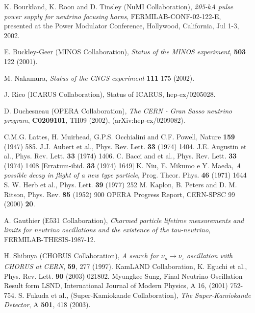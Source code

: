 \begin{thebibliography}{99}

 K. Bourkland, K. Roon and D. Tinsley (NuMI Collaboration),{\emph{ 205-kA pulse power supply for neutrino focusing horns}}, FERMILAB-CONF-02-122-E, presented at the Power Modulator Conference, Hollywood, California, Jul 1-3, 2002.

 E. Buckley-Geer (MINOS Collaboration), \emph{Status of the MINOS experiment}, \textbf{503}  122 (2001).

 M. Nakamura, {\emph{Status of the CNGS experiment}} \textbf{111}  175 (2002).

 J. Rico (ICARUS Collaboration), Status of ICARUS, hep-ex/0205028.

 D. Duchesneau (OPERA Collaboration), {\emph{The CERN - Gran Sasso neutrino program}}, \textbf{C0209101}, TH09 (2002),  (arXiv:hep-ex/0209082).

 C.M.G. Lattes, H. Muirhead, G.P.S. Occhialini and C.F. Powell, Nature {\bf{159}} (1947) 585. 
 J.J. Aubert et al., Phys. Rev. Lett. {\bf{33}} (1974) 1404.
 J.E. Augustin et al., Phys. Rev. Lett. {\bf{33}} (1974) 1406.
 C. Bacci and et al., Phys. Rev. Lett. {\bf{33}} (1974) 1408 [Erratum-ibid. {\bf{33}} (1974) 1649]
  K. Niu, E. Mikumo e Y. Maeda, {\em A possible decay in flight of a new type particle},
Prog. Theor. Phys. \textbf{46} (1971) 1644
  S. W. Herb et al., Phys. Lett. {\bf{39}} (1977) 252
 M. Kaplon, B. Peters and D. M. Ritson, Phys. Rev. {\bf{85}} (1952) 900
 OPERA Progress Report, CERN-SPSC 99 (2000) \textbf{20}.

 A. Gauthier (E531 Collaboration),{\emph{ Charmed particle lifetime measurements and limits for neutrino oscillations and the existence of the tau-neutrino}}, FERMILAB-THESIS-1987-12.

 H. Shibuya (CHORUS Collaboration),{\emph{ A search for $\nu_\mu\rightarrow \nu_\tau$ oscillation with CHORUS at CERN}}, \textbf{59}, 277 (1997).
 KamLAND Collaboration, K. Eguchi { et al.}, 
Phys. Rev. Lett.
{\bf 90} (2003) 021802.
 Myungkee Sung, Final Neutrino Oscillation Result form LSND, International Journal of Modern Physics, A  16, (2001) 752-754.
 S. Fukuda et al., (Super-Kamiokande Collaboration),{\emph{ The Super-Kamiokande Detector}}, A \textbf{501}, 418 (2003).


\end{thebibliography}
